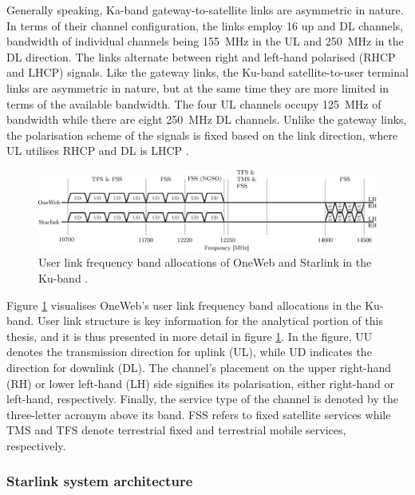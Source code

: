 \documentclass[english, 12pt, a4paper, elec, utf8, a-1b, online]{aaltothesis}
\begin{document}
Generally speaking, Ka-band gateway-to-satellite links are asymmetric in nature. In terms of their channel configuration, the links employ 16 up and DL channels, bandwidth of individual channels being \SI{155}{\mega\hertz} in the UL and \SI{250}{\mega\hertz} in the DL direction. The links alternate between right and left-hand polarised (RHCP and LHCP) signals.
Like the gateway links, the Ku-band satellite-to-user terminal links are asymmetric in nature, but at the same time they are more limited in terms of the available bandwidth.
The four UL channels occupy \SI{125}{\mega\hertz} of bandwidth while there are eight \SI{250}{\mega\hertz} DL channels.
Unlike the gateway links, the polarisation scheme of the signals is fixed based on the link direction, where UL utilises RHCP and DL is LHCP \cite{portillo2019technical,allen2022terrestrial}.

\begin{figure}[h]
  \centering
  \includegraphics[width=145mm]{figures/fig-ku-band.eps}
  \caption{User link frequency band allocations of OneWeb and Starlink in the Ku-band \cite{portillo2019technical}.}
  \label{fig-ku-band}
\end{figure}

Figure \ref{fig-ku-band} visualises OneWeb's user link frequency band allocations in the Ku-band.
User link structure is key information for the analytical portion of this thesis, and it is thus presented in more detail in figure \ref{fig-ku-band}.
In the figure, UU denotes the transmission direction for uplink (UL), while UD indicates the direction for downlink (DL).
The channel's placement on the upper right-hand (RH) or lower left-hand (LH) side signifies its polarisation, either right-hand or left-hand, respectively.
Finally, the service type of the channel is denoted by the three-letter acronym above its band.
FSS refers to fixed satellite services while TMS and TFS denote terrestrial fixed and terrestrial mobile services, respectively.

\subsubsection{Starlink system architecture}
\end{document}
